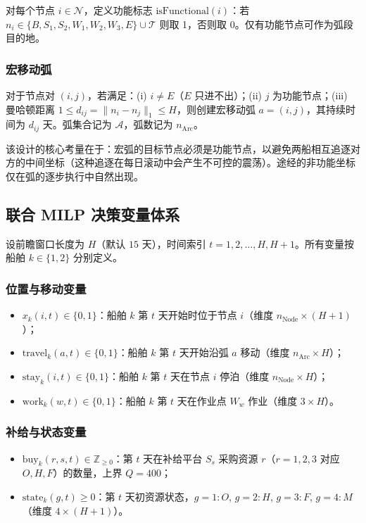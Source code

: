 对每个节点 $i\in\mathcal{N}$，定义功能标志 $\mathrm{isFunctional}(i)$：若 $n_i\in\{B,S_1,S_2,W_1,W_2,W_3,E\}\cup\mathcal{T}$ 则取 1，否则取 0。仅有功能节点可作为弧段目的地。

\subsubsection{宏移动弧}

对于节点对 $(i,j)$，若满足：(i) $i\neq E$（$E$ 只进不出）；(ii) $j$ 为功能节点；(iii) 曼哈顿距离 $1\leq d_{ij}=\|n_i-n_j\|_1\leq H$，则创建宏移动弧 $a=(i,j)$，其持续时间为 $d_{ij}$ 天。弧集合记为 $\mathcal{A}$，弧数记为 $n_{\text{Arc}}$。

该设计的核心考量在于：宏弧的目标节点必须是功能节点，以避免两船相互追逐对方的中间坐标（这种追逐在每日滚动中会产生不可控的震荡）。途经的非功能坐标仅在弧的逐步执行中自然出现。

\subsection{联合 MILP 决策变量体系}

设前瞻窗口长度为 $H$（默认 $15$ 天），时间索引 $t=1,2,\dots,H,H+1$。所有变量按船舶 $k\in\{1,2\}$ 分别定义。

\subsubsection{位置与移动变量}
\begin{itemize}
    \item $x_k(i,t)\in\{0,1\}$：船舶 $k$ 第 $t$ 天开始时位于节点 $i$（维度 $n_{\text{Node}}\times(H+1)$）；
    \item $\text{travel}_k(a,t)\in\{0,1\}$：船舶 $k$ 第 $t$ 天开始沿弧 $a$ 移动（维度 $n_{\text{Arc}}\times H$）；
    \item $\text{stay}_k(i,t)\in\{0,1\}$：船舶 $k$ 第 $t$ 天在节点 $i$ 停泊（维度 $n_{\text{Node}}\times H$）；
    \item $\text{work}_k(w,t)\in\{0,1\}$：船舶 $k$ 第 $t$ 天在作业点 $W_w$ 作业（维度 $3\times H$）。
\end{itemize}

\subsubsection{补给与状态变量}
\begin{itemize}
    \item $\text{buy}_k(r,s,t)\in\mathbb{Z}_{\geq0}$：第 $t$ 天在补给平台 $S_s$ 采购资源 $r$（$r=1,2,3$ 对应 $O,H,F$）的数量，上界 $Q=400$；
    \item $\text{state}_k(g,t)\geq0$：第 $t$ 天初资源状态，$g=1:O$, $g=2:H$, $g=3:F$, $g=4:M$（维度 $4\times(H+1)$）。
\end{itemize}

